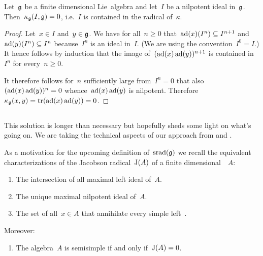 \begin{lemma}
  \label{nilpotent is in killing radical}
  Let~$\mathfrak{g}$ be a finite dimensional Lie~algebra and let~$I$ be a nilpotent ideal in~$\mathfrak{g}$.
  Then~$\kappa_{\mathfrak{g}}(I, \mathfrak{g}) = 0$, i.e.~$I$ is contained in the radical of~$\kappa$.
\end{lemma}

\begin{proof}
  Let~$x \in I$ and~$y \in \mathfrak{g}$.
  We have for all~$n \geq 0$ that~$\operatorname{ad}(x)(I^n) \subseteq I^{n+1}$ and~$\operatorname{ad}(y)(I^n) \subseteq I^n$ because~$I^n$ is an ideal in~$I$.
  (We are using the convention~$I^0 = I$.)
  It hence follows by induction that the image of~$(\operatorname{ad}(x)\operatorname{ad}(y))^{n+1}$ is contained in~$I^n$ for every~$n \geq 0$.

  It therefore follows for~$n$ sufficiently large from~$I^n = 0$ that also~$(\operatorname{ad}(x)\operatorname{ad}(y))^n = 0$ whence~$\operatorname{ad}(x)\operatorname{ad}(y)$ is nilpotent.
  Therefore~$\kappa_{\mathfrak{g}}(x,y) = \operatorname{tr}(\operatorname{ad}(x)\operatorname{ad}(y)) = 0$.
\end{proof}



\subsection{}
\label{complicated part}

This solution is longer than necessary but hopefully sheds some light on what’s going on.
We are taking the technical aspects of our approach from \cite[I.{\S}5.3]{bourbaki_lie} and \cite[\S19.5]{tauvel_yu}.

\begin{recall}
  As a motivation for the upcoming definition of~$\operatorname{srad}(\mathfrak{g})$ we recall the equivalent characterizations of the Jacobson radical~$\operatorname{J}(A)$ of a finite dimensional~{}~$A$:
  \begin{enumerate}
    \item
      The intersection of all maximal left ideal of~$A$.
    \item
      The unique maximal nilpotent ideal of~$A$.
    \item
      The set of all~$x \in A$ that annihilate every simple left~{}.
  \end{enumerate}
  Moreover:
  \begin{enumerate}[resume]
    \item
      The algebra~$A$ is semisimple if and only if~$\operatorname{J}(A) = 0$.
  \end{enumerate}
\end{recall}

